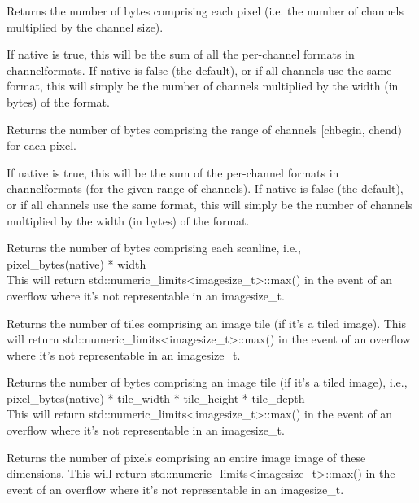 Returns the number of bytes comprising each pixel (i.e. the number of
channels multiplied by the channel size).

If {\cf native} is true, this will be the sum of all the per-channel
formats in {\cf channelformats}.  If {\cf native} is false (the
default), or if all channels use the same format, this will simply be
the number of channels multiplied by the width (in bytes) of the {\cf format}.
\apiend

Returns the number of bytes comprising the range of channels 
  $[${\cf chbegin}, {\cf chend}$)$ for each pixel.

If {\cf native} is true, this will be the sum of the per-channel
formats in {\cf channelformats} (for the given range of channels).  
If {\cf native} is false (the
default), or if all channels use the same format, this will simply be
the number of channels multiplied by the width (in bytes) of the {\cf format}.
\apiend

Returns the number of bytes comprising each scanline,
i.e., \\ {\cf pixel_bytes(native) * width} \\
This will return {\cf std::numeric_limits<imagesize_t>::max()} in the event
of an overflow where it's not representable in an {\cf imagesize_t}.
\apiend

Returns the number of tiles comprising an image tile (if it's a tiled image).
This will return {\cf std::numeric_limits<imagesize_t>::max()} in the event
of an overflow where it's not representable in an {\cf imagesize_t}.
\apiend

Returns the number of bytes comprising an image tile (if it's a tiled
image), i.e., \\ {\cf pixel_bytes(native) * tile_width * tile_height * tile_depth } \\
This will return {\cf std::numeric_limits<imagesize_t>::max()} in the event
of an overflow where it's not representable in an {\cf imagesize_t}.
\apiend

Returns the number of pixels comprising an entire image image of these dimensions.
This will return {\cf std::numeric_limits<imagesize_t>::max()} in the event
of an overflow where it's not representable in an {\cf imagesize_t}.
\apiend

